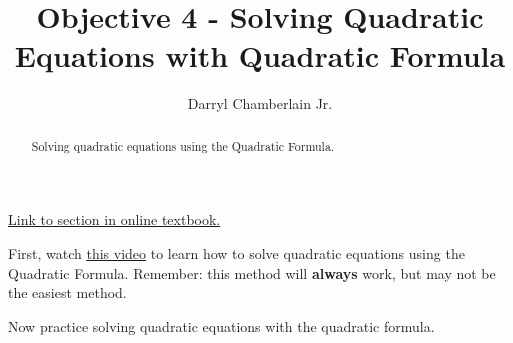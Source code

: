\documentclass{ximera}
\author{Darryl Chamberlain Jr.}
\title{Objective 4 - Solving Quadratic Equations with Quadratic Formula}
\begin{document}
\begin{abstract}
Solving quadratic equations using the Quadratic Formula.
\end{abstract}
\maketitle

\href{https://cnx.org/contents/mwjClAV_@8.1:-Sm9he1Q@17/Quadratic-Functions}{Link to section in online textbook.}


First, watch \underline{\href{https://mediasite.video.ufl.edu/Mediasite/Play/75f74a5b7d244e30b1b4e24253f595f61d}{this video}} to learn how to solve quadratic equations using the Quadratic Formula. Remember: this method will \textbf{always} work, but may not be the easiest method. 

Now practice solving quadratic equations with the quadratic formula. 
\end{document}
